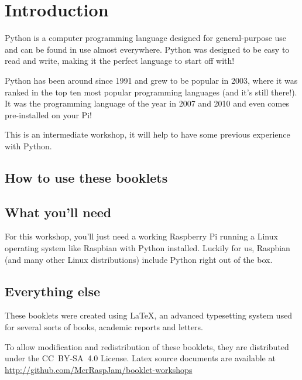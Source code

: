 \setcounter{section}{-1}
\section{Introduction}

	Python is a computer programming language designed for general-purpose use and can be found in use almost everywhere. Python was designed to be easy to read and write, making it the perfect language to start off with!

	Python has been around since 1991 and grew to be popular in 2003, where it was ranked in the top ten most popular programming languages (and it's still there!). It was the programming language of the year in 2007 and 2010 and even comes pre-installed on your Pi!

	This is an intermediate workshop, it will help to have some previous experience with Python.

	\subsection*{How to use these booklets}

		

		
		


	\subsection*{What you'll need}

		For this workshop, you'll just need a working Raspberry Pi running a Linux operating system like Raspbian with Python installed. Luckily for us, Raspbian (and many other Linux distributions) include Python right out of the box.

	\subsection*{Everything else}

		\ifprint\else These booklets were created using \textrm{\LaTeX}, an advanced typesetting system used for several sorts of books, academic reports and letters. \fi

		To allow modification and redistribution of these booklets, they are distributed under the \hbox{CC BY-SA 4.0} License.
		Latex source documents are available at \url{http://github.com/McrRaspJam/booklet-workshops}
